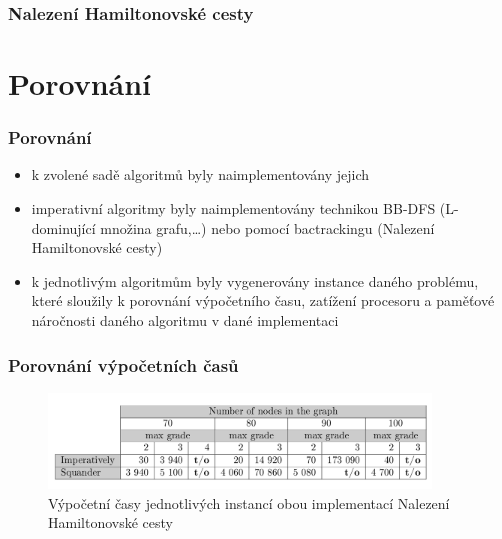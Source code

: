 \documentclass[czech]{beamer}
\begin{document}
\begin{frame}
  \frametitle{Nalezení Hamiltonovské cesty}   
  
  
  
\end{frame}




\section{Porovnání}

\begin{frame}
  \frametitle{Porovnání}   %
  
  \begin{itemize}
  \item<1-> k zvolené sadě algoritmů byly naimplementovány jejich
  \item<2-> imperativní algoritmy byly naimplementovány technikou BB-DFS
  (L-dominující množina grafu,\ldots) nebo pomocí bactrackingu (Nalezení
  Hamiltonovské cesty)
  \item<3-> k jednotlivým algoritmům byly vygenerovány instance daného problému,
  které sloužily k porovnání výpočetního času, zatížení procesoru a paměťové
  náročnosti daného algoritmu v dané implementaci
  \end{itemize}
  
\end{frame}

\begin{frame}
  \frametitle{Porovnání výpočetních časů}
\begin{figure}[h]

	\begin{center}
   	\includegraphics[width=4in]{img/exec-times} 
   \end{center}
   \caption{\tiny Výpočetní časy jednotlivých instancí obou implementací Nalezení
Hamiltonovské cesty}
 \end{figure}  

  
\end{frame}
\end{document}
